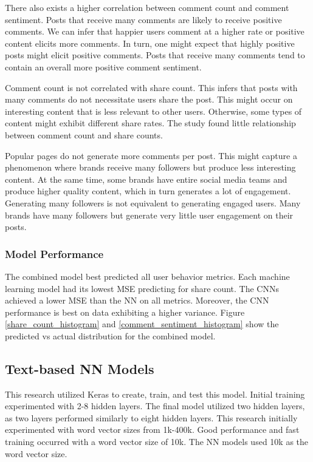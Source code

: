 \documentclass{article}
\begin{document}
There also exists a higher correlation between comment count and comment sentiment. Posts that receive many comments are likely to receive positive comments. We can infer that happier users comment at a higher rate or positive content elicits more comments. In turn, one might expect that highly positive posts might elicit positive comments. Posts that receive many comments tend to contain an overall more positive comment sentiment.

Comment count is not correlated with share count. This infers that posts with many comments do not necessitate users share the post. This might occur on interesting content that is less relevant to other users. Otherwise, some types of content might exhibit different share rates. The study found little relationship between comment count and share counts.

Popular pages do not generate more comments per post. This might capture a phenomenon where brands receive many followers but produce less interesting content. At the same time, some brands have entire social media teams and produce higher quality content, which in turn generates a lot of engagement. Generating many followers is not equivalent to generating engaged users. Many brands have many followers but generate very little user engagement on their posts.

\subsubsection{Model Performance}
The combined model best predicted all user behavior metrics. Each machine learning model had its lowest MSE predicting for share count. The CNNs achieved a lower MSE than the NN on all metrics. Moreover, the CNN performance is best on data exhibiting a higher variance. Figure \ref{share_count_histogram} and \ref{comment_sentiment_histogram} show the predicted vs actual distribution for the combined model.

\subsection{Text-based NN Models}
This research utilized Keras to create, train, and test this model. Initial training experimented with 2-8 hidden layers. The final model utilized two hidden layers, as two layers performed similarly to eight hidden layers. This research initially experimented with word vector sizes from 1k-400k. Good performance and fast training occurred with a word vector size of 10k. The NN models used 10k as the word vector size.
\end{document}
